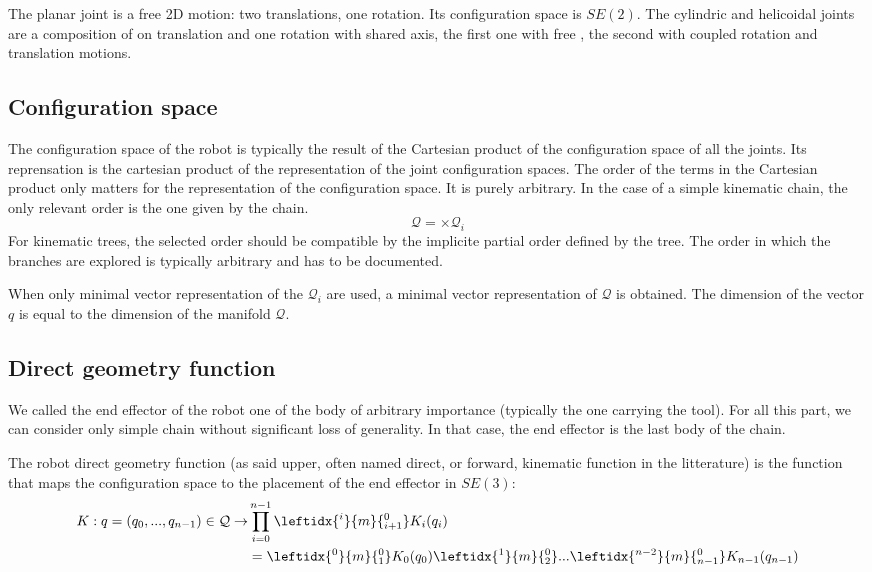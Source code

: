 \documentclass{book}
\begin{document}
The planar joint is a free 2D motion: two translations, one rotation. Its configuration space is $SE(2)$. The cylindric and helicoidal joints are a composition of on translation and one rotation with shared axis, the first one with free , the second with coupled rotation and translation motions.

\subsection{Configuration space}

The configuration space of the robot is typically the result of the Cartesian product of the configuration space of all the joints. Its reprensation is the cartesian product of the representation of the joint configuration spaces. The order of the terms in the Cartesian product only matters for the representation of the configuration space. It is purely arbitrary.
In the case of a simple kinematic chain, the only relevant order is the one given by the chain.
\[ \mathcal{Q} = \times \mathcal{Q}_i \]
For kinematic trees, the selected order should be compatible by the implicite partial order defined by the tree. The order in which the branches are explored is typically arbitrary and has to be documented.

When only minimal vector representation of the $\mathcal{Q}_i$ are used, a minimal vector representation of $\mathcal{Q}$ is obtained. The dimension of the vector $q$ is equal to the dimension of the manifold $\mathcal{Q}$.

\subsection{Direct geometry function}

We called the end effector of the robot one of the body of arbitrary importance (typically the one carrying the tool). 
For all this part, we can consider only simple chain without significant loss of generality. In that case, the end effector is the last body of the chain.

The robot direct geometry function (as said upper, often named direct, or forward, kinematic function in the litterature) is the function that maps the configuration space to the placement of the end effector in $SE(3)$:
\begin{align*}
 K: q = (q_0, ... , q_{n-1}) \in \mathcal{Q}  \rightarrow & \prod_{i=0}^{n-1} \leftidx{^i}{m}{_{i+1}^0} K_i(q_i) \\
&=  \leftidx{^0}{m}{_{1}^0} K_0(q_0) \leftidx{^1}{m}{_{2}^0} ...   \leftidx{^{n-2}}{m}{_{n-1}^0} K_{n-1}(q_{n-1})
\end{align*}
\end{document}
